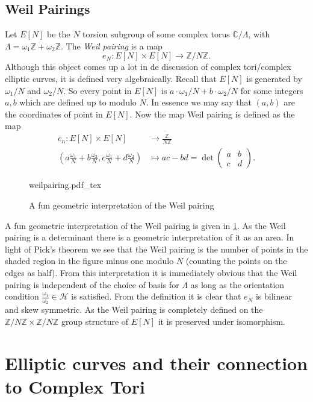 \documentclass[titlepage,a4paper]{article}
\newcommand{\incfig}[1]{%
	\def\svgwidth{\columnwidth}
	{#1.pdf_tex}
}
\theoremstyle{theoremdd}
\theoremstyle{definitiondd}
\theoremstyle{remarkdd}
\newcommand{\Z}{\mathbb{Z}}
\newcommand{\C}{\mathbb{C}}
\begin{document}
\subsection{Weil Pairings} \label{sec:Weil_Pairings}
Let $E[N]$ be the  $N$ torsion subgroup of some complex torus $\C / \Lambda$, with $\Lambda = \omega_1\Z + \omega_2 \Z$. 
The \emph{Weil pairing} is a map \[
	e_N: E[N] \times E[N] \to \Z / N\Z
.\] 
Although this object comes up a lot in de discussion of complex tori/complex elliptic curves, it is defined very algebraically. 
Recall that $E[N]$ is generated by $\omega_1 / N$ and $\omega_2 / N$. So every point in $E[N]$ is  $a \cdot \omega_1 / N + b \cdot \omega_2 / N$ for some integers $a, b$ which are defined up to modulo $N$. In essence we may say that $(a, b)$ are the coordinates of point in $E[N]$. 
Now the map Weil pairing is defined as the map
\begin{align*}
	e_n: E[N] \times  E[N] &\longrightarrow \frac{\Z}{N\Z} \\
	\left(a \frac{\omega_1}{N} + b \frac{\omega_2}{N}, c \frac{\omega_1}{N} + d \frac{\omega_2}{N}\right) &\longmapsto ac-bd =  \det \begin{pmatrix} a & b \\ c& d \end{pmatrix} 
.\end{align*}
\begin{figure}[h]
	\incfig{weilpairing}
	\caption{A fun geometric interpretation of the Weil pairing}
	\label{fig:weilpairing}
\end{figure}
A fun geometric interpretation of the Weil pairing is given in \cref{fig:weilpairing}. As the Weil pairing is a determinant there is a geometric interpretation of it as an area. In light of Pick's theorem \cite{wiki:pick} we see that the Weil pairing is the number of points in the shaded region in the figure minus one modulo $N$ (counting the points on the edges as half). 
From this interpretation it is immediately obvious that the Weil pairing is independent of the choice of basis for  $\Lambda$ as long as the orientation condition $\frac{\omega_1}{\omega_2} \in \mathcal{H}$ is satisfied. 
From the definition it is clear that $e_N$ is bilinear and skew symmetric.
As the Weil pairing is completely defined on the  $\Z / N \Z \times  \Z / N\Z$ group structure of $E[N]$ it is preserved under isomorphism.
\section{Elliptic curves and their connection to Complex Tori}
\end{document}
